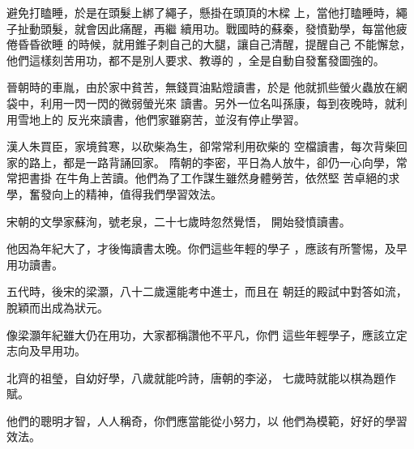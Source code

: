 \documentclass[avery5371,grid]{flashcards}
\begin{document}
{避免打瞌睡，於是在頭髮上綁了繩子，懸掛在頭頂的木樑
上，當他打瞌睡時，繩子扯動頭髮，就會因此痛醒，再繼
續用功。戰國時的蘇秦，發憤勤學，每當他疲倦昏昏欲睡
的時候，就用錐子刺自己的大腿，讓自己清醒，提醒自己
不能懈怠，他們這樣刻苦用功，都不是別人要求、教導的
，全是自動自發奮發圖強的。} %
{} %

{晉朝時的車胤，由於家中貧苦，無錢買油點燈讀書，於是
他就抓些螢火蟲放在網袋中，利用一閃一閃的微弱螢光來
讀書。另外一位名叫孫康，每到夜晚時，就利用雪地上的
反光來讀書，他們家雖窮苦，並沒有停止學習。} %
{} %






{漢人朱買臣，家境貧寒，以砍柴為生，卻常常利用砍柴的
空檔讀書，每次背柴回家的路上，都是一路背誦回家。
隋朝的李密，平日為人放牛，卻仍一心向學，常常把書掛
在牛角上苦讀。他們為了工作謀生雖然身體勞苦，依然堅
苦卓絕的求學，奮發向上的精神，值得我們學習效法。} %
{} %

{宋朝的文學家蘇洵，號老泉，二十七歲時忽然覺悟，
開始發憤讀書。} %
{} %

{他因為年紀大了，才後悔讀書太晚。你們這些年輕的學子
，應該有所警惕，及早用功讀書。} %
{} %

{五代時，後宋的梁灝，八十二歲還能考中進士，而且在
朝廷的殿試中對答如流，脫穎而出成為狀元。} %
{} %

{像梁灝年紀雖大仍在用功，大家都稱讚他不平凡，你們
這些年輕學子，應該立定志向及早用功。} %
{} %

{北齊的祖瑩，自幼好學，八歲就能吟詩，唐朝的李泌，
七歲時就能以棋為題作賦。} %
{} %






{他們的聰明才智，人人稱奇，你們應當能從小努力，以
他們為模範，好好的學習效法。} %
{} %
\end{document}
